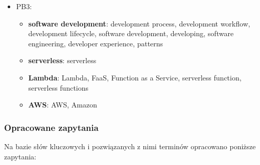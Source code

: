 \begin{itemize}
\begin{itemize}
    \end{itemize}
    \item PB3:
    \begin{itemize}
        \item \textbf{software development}: development process, development workflow, development lifecycle, software development, developing, software engineering, developer experience, patterns
        \item \textbf{serverless}: serverless
        \item \textbf{Lambda}: Lambda, FaaS, Function as a Service, serverless function, serverless functions
        \item \textbf{AWS}: AWS, Amazon
    \end{itemize}
\end{itemize}

\subsubsection*{Opracowane zapytania}

Na bazie słów kluczowych i pozwiązanych z nimi terminów opracowano poniższe zapytania:

